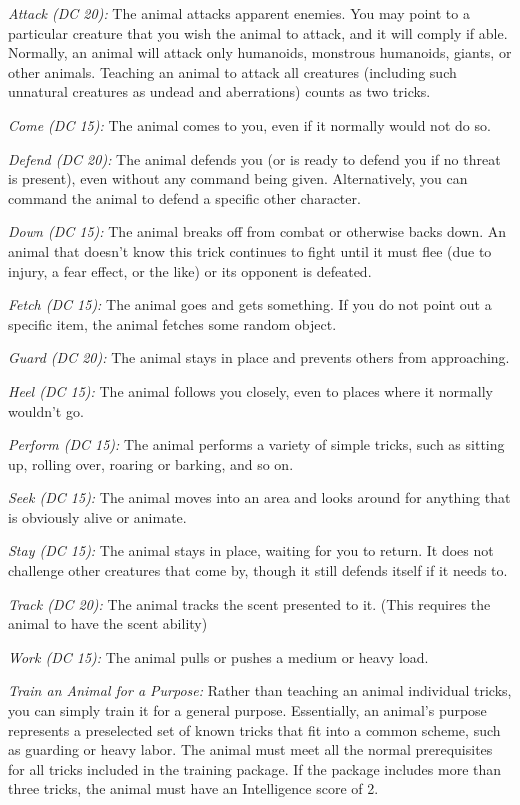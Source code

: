 \textit{Attack (DC 20):} The animal attacks apparent enemies. You may point to a particular creature that you wish the animal to attack, and it will comply if able. Normally, an animal will attack only humanoids, monstrous humanoids, giants, or other animals. Teaching an animal to attack all creatures (including such unnatural creatures as undead and aberrations) counts as two tricks.

\textit{Come (DC 15):} The animal comes to you, even if it normally would not do so.

\textit{Defend (DC 20):} The animal defends you (or is ready to defend you if no threat is present), even without any command being given. Alternatively, you can command the animal to defend a specific other character.

\textit{Down (DC 15):} The animal breaks off from combat or otherwise backs down. An animal that doesn't know this trick continues to fight until it must flee (due to injury, a fear effect, or the like) or its opponent is defeated.

\textit{Fetch (DC 15):} The animal goes and gets something. If you do not point out a specific item, the animal fetches some random object.

\textit{Guard (DC 20):} The animal stays in place and prevents others from approaching.

\textit{Heel (DC 15):} The animal follows you closely, even to places where it normally wouldn't go.

\textit{Perform (DC 15):} The animal performs a variety of simple tricks, such as sitting up, rolling over, roaring or barking, and so on.

\textit{Seek (DC 15):} The animal moves into an area and looks around for anything that is obviously alive or animate.

\textit{Stay (DC 15):} The animal stays in place, waiting for you to return. It does not challenge other creatures that come by, though it still defends itself if it needs to.

\textit{Track (DC 20):} The animal tracks the scent presented to it. (This requires the animal to have the scent ability)

\textit{Work (DC 15):} The animal pulls or pushes a medium or heavy load.

\textit{Train an Animal for a Purpose:} Rather than teaching an animal individual tricks, you can simply train it for a general purpose. Essentially, an animal's purpose represents a preselected set of known tricks that fit into a common scheme, such as guarding or heavy labor. The animal must meet all the normal prerequisites for all tricks included in the training package. If the package includes more than three tricks, the animal must have an Intelligence score of 2.

